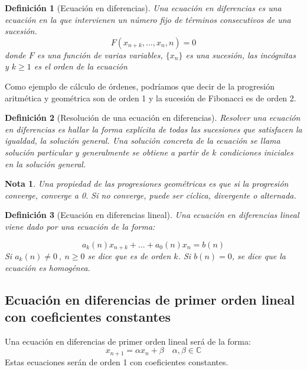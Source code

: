 \documentclass[11pt, a4paper, titlepage]{article}
\theoremstyle{theorem-style}
\theoremstyle{definition-style}
\newtheorem*{ndef}{Definición}
\theoremstyle{remark-style}
\newtheorem*{nota}{Nota}
\theoremstyle{example-style}
\begin{document}
\begin{ndef}[Ecuación en diferencias]
	Una ecuación en diferencias es una ecuación en la que intervienen un número fijo de términos consecutivos de una sucesión.
	\[
	F(x_{n+k},\dots, x_n , n)= 0
	\]
donde $F$ es una función de varias variables, $\{x_n\}$ es una sucesión, las incógnitas y $k \geq 1 $ es el orden de la ecuación
\end{ndef}

Como ejemplo de cálculo de órdenes, podríamos que decir de la progresión aritmética y geométrica son de orden 1 y la sucesión de Fibonacci es de orden 2.

\begin{ndef}[Resolución de una ecuación en diferencias]
	Resolver una ecuación en diferencias es hallar la forma explícita de todas las sucesiones que satisfacen la igualdad, la solución general. Una solución concreta de la ecuación se llama solución particular y generalmente se obtiene a partir de $k$ condiciones iniciales en la solución general.
\end{ndef}

\begin{nota}
	Una propiedad de las progresiones geométricas es que si la progresión converge, converge a 0. Si no converge, puede ser cíclica, divergente o alternada.
\end{nota}

\begin{ndef}[Ecuación en diferencias lineal]
	Una ecuación en diferencias lineal viene dado por una ecuación de la forma:

\[
a_k(n)x_{n+k} + ... + a_0(n)x_n = b(n)
\]
Si $a_k(n)\ne 0 \ , \ n \geq 0$ se dice que es de orden $k$. Si $b(n) = 0$, se dice que la ecuación es homogénea.
\end{ndef}


\subsection{Ecuación en diferencias de primer orden lineal con coeficientes constantes}

Una ecuación en diferencias de primer orden lineal será de la forma:
\[
x_{n+1} = \alpha x_n +  \beta \quad \alpha,\beta \in \mathbb{C}
\]
Estas ecuaciones serán de orden 1 con coeficientes constantes.
\end{document}
